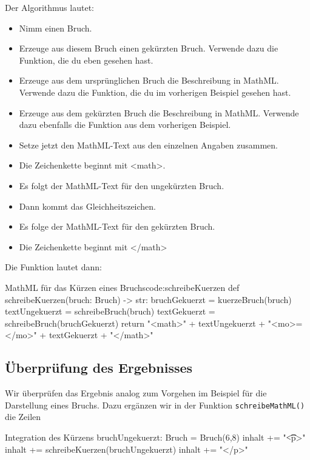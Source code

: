 Der Algorithmus lautet:
\begin{itemize}
	\item Nimm einen Bruch.
	\item Erzeuge aus diesem Bruch einen gekürzten Bruch. Verwende dazu die Funktion, die du eben gesehen hast.
	\item Erzeuge aus dem ursprünglichen Bruch die Beschreibung in MathML. Verwende dazu die Funktion, die du im vorherigen Beispiel gesehen hast.
	\item Erzeuge aus dem gekürzten Bruch die Beschreibung in MathML. Verwende dazu ebenfalls die Funktion aus dem vorherigen Beispiel.
	\item Setze jetzt den MathML-Text aus den einzelnen Angaben zusammen.
	\item Die Zeichenkette beginnt mit <math>.
	\item Es folgt der MathML-Text für den ungekürzten Bruch.
	\item Dann kommt das Gleichheitszeichen.
	\item Es folge der MathML-Text für den gekürzten Bruch.
	\item Die Zeichenkette beginnt mit </math>
\end{itemize}

Die Funktion lautet dann:
\begin{codePython}{MathML für das Kürzen eines Bruchs}{code:schreibeKuerzen}
def schreibeKuerzen(bruch: Bruch) -> str:
	bruchGekuerzt = kuerzeBruch(bruch)
	textUngekuerzt = schreibeBruch(bruch)
	textGekuerzt = schreibeBruch(bruchGekuerzt)
	return "<math>" + textUngekuerzt + "<mo>=</mo>" + textGekuerzt + "</math>"
\end{codePython}

\subsection{Überprüfung des Ergebnisses}

Wir überprüfen das Ergebnis analog zum Vorgehen im Beispiel für die Darstellung eines Bruchs. Dazu ergänzen wir in der Funktion \texttt{schreibeMathML()} die
Zeilen

\begin{codePython}{Integration des Kürzens}
bruchUngekuerzt: Bruch = Bruch(6,8)
inhalt += "\n\t\t<p>"
inhalt += schreibeKuerzen(bruchUngekuerzt)
inhalt += "</p>"
\end{codePython}